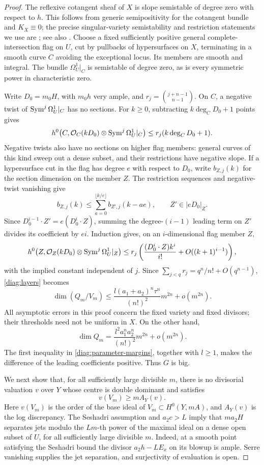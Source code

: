 \begin{proof}
The reflexive cotangent sheaf of $X$ is slope semistable of degree zero
with respect to $h$.  This follows from generic semipositivity for the
cotangent bundle and $K_X\equiv0$; the precise singular-variety
semistability and restriction statements we use are
\citep[Theorem~5.3 and Proposition~5.4]{GKP2016}; see also
\citep[Theorem~1.3]{CP2019}.  Choose a fixed sufficiently positive
general complete-intersection flag on $U$, cut by pullbacks of
hypersurfaces on $X$, terminating in a smooth curve $C$ avoiding the
exceptional locus.  Its members are smooth and integral.  The bundle
$\Omega_U^1|_C$ is semistable of degree zero, as is every symmetric
power in characteristic zero.

Write $D_0=m_0H$, with $m_0h$ very ample, and
$r_j=\binom{j+n-1}{n-1}$.  On $C$, a negative twist of
$\operatorname{Sym}^j\Omega_U^1|_C$ has no sections.  For $k\ge0$, subtracting
$k\deg_C D_0+1$ points gives
\[
 h^0\bigl(C,\mathcal O_C(kD_0)\otimes\operatorname{Sym}^j\Omega_U^1|_C\bigr)
 \le r_j(k\deg_C D_0+1).
\]
Negative twists also have no sections on higher flag members: general
curves of this kind sweep out a dense subset, and their restrictions
have negative slope.  If a hypersurface cut in the flag has degree $e$
with respect to $D_0$, write $b_{Z,j}(k)$ for the section dimension on
the member $Z$.  The restriction sequences and negative-twist vanishing give
\[
 b_{Z,j}(k)\le
 \sum_{a=0}^{\lfloor k/e\rfloor}b_{Z',j}(k-ae),
 \qquad Z'\in|eD_0|_Z.
\]
Since $D_0^{i-1}\cdot Z'=e(D_0^i\cdot Z)$, summing the degree-$(i-1)$
leading term on $Z'$ divides its coefficient by $ei$.  Induction gives,
on an $i$-dimensional flag member $Z$,
\[
 h^0\bigl(Z,\mathcal O_Z(kD_0)\otimes\operatorname{Sym}^j\Omega_U^1|_Z\bigr)
 \le r_j\left(\frac{(D_0^i\cdot Z)k^i}{i!}
                +O((k+1)^{i-1})\right),
\]
with the implied constant independent of $j$.  Since
$\sum_{j<q}r_j=q^n/n!+O(q^{n-1})$, \eqref{diag:layers} becomes
\begin{equation}\label{diag:section-upper}
 \dim(Q_m/V_m)
 \le \frac{l(a_1+a_2)^n\tau^n}{(n!)^2}m^{2n}
       +o(m^{2n}).
\end{equation}
All asymptotic errors in this proof concern the fixed variety and fixed
divisors; their thresholds need not be uniform in $X$.
On the other hand,
\[
 \dim Q_m=
 \frac{l^2a_1^na_2^n}{(n!)^2}m^{2n}+o(m^{2n}).
\]
The first inequality in \eqref{diag:parameter-margins}, together with
$l\ge1$, makes the difference of the leading coefficients positive.
Thus $G$ is big.

We next show that, for all sufficiently large divisible $m$, there is no
divisorial valuation $v$ over $Y$ whose centre is double dominant and
satisfies
\begin{equation}\label{diag:excluded-valuation}
 v(V_m)\ge m A_Y(v).
\end{equation}
Here $v(V_m)$ is the order of the base ideal of $V_m\subset H^0(Y,mA)$,
and $A_Y(v)$ is the log discrepancy.  The Seshadri assumption and
$a_2c>L$ imply that $ma_2H$ separates jets modulo the $Lm$-th power of
the maximal ideal on a dense open subset of $U$, for all sufficiently
large divisible $m$.  Indeed, at a smooth point satisfying the
Seshadri bound the divisor $a_2h-LE_x$ on its blowup is ample.  Serre
vanishing supplies the jet separation, and surjectivity of evaluation
is open.


\end{proof}
